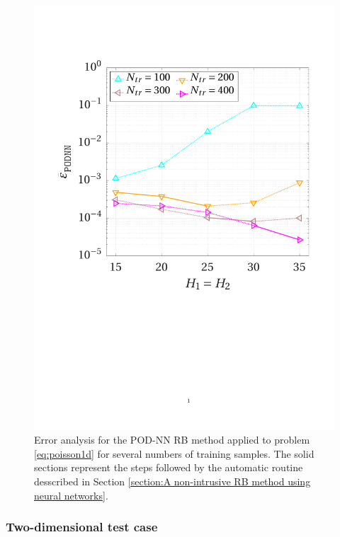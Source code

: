 \documentclass{elsarticle}
\numberwithin{equation}{section}
\theoremstyle{theorem}
\theoremstyle{definition}
\theoremstyle{remark}
\theoremstyle{proposition}
\numberwithin{figure}{section}
\begin{document}
		\begin{figure}[t!]
			\center
			\includegraphics[scale = 0.4, trim = {1cm 9.8cm 1.5cm 3.5cm}, clip]{poisson1d_3_nn_convergence}
			
			\caption{Error analysis for the POD-NN RB method applied to problem \eqref{eq:poisson1d} for several numbers of training samples. The solid sections represent the steps followed by the automatic routine desscribed in Section \ref{section:A non-intrusive RB method using neural networks}.}
			\label{fig:poisson1d-fig3}
		\end{figure}
				
		
	
	\subsubsection{Two-dimensional test case}
	\label{section:Two-dimensional test case}
		
\end{document}
